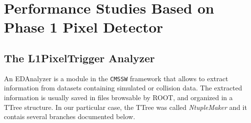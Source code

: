 \documentclass[a4paper,12pt,oneside]{article}
\newcommand{\HRule}{\rule{\linewidth}{0.5mm}}
\begin{document}

















\section{Performance Studies Based on Phase 1 Pixel Detector}

        \subsection{The L1PixelTrigger Analyzer}
        An EDAnalyzer is a module in the \texttt{CMSSW} framework that allows to extract information from datasets containing simulated or collision data. The extracted information is usually saved in files browsable by ROOT, and organized in a TTree structure. In our particular case, the TTree was called \textit{NtupleMaker} and it contais several branches documented below.
\end{document}
